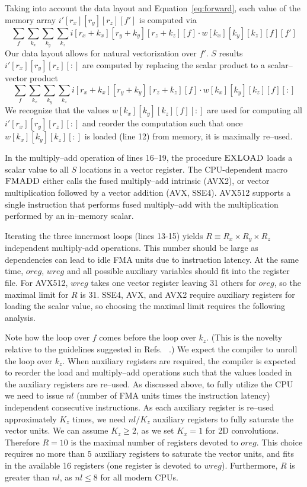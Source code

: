   Taking into account the data layout and Equation~\ref{eq:forward},
  each value of the memory array $i'[r_x][r_y][r_z][f']$ is computed
  via
  {\footnotesize
  \[
    \sum_{f} \sum_{k_x} \sum_{k_y} \sum_{k_z}
    i[r_x+k_x][r_y+k_y][r_z+k_z][f] \cdot w[k_x][k_y][k_z][f][f']
    \]
    }
  Our data layout allows for natural vectorization over $f'$.  $S$
  results $i'[r_x][r_y][r_z][:]$ are computed by replacing the scalar
  product to a scalar--vector product
{\footnotesize
  \[
  \sum_{f} \sum_{k_x} \sum_{k_y} \sum_{k_z}
  i[r_x+k_x][r_y+k_y][r_z+k_z][f] \cdot w[k_x][k_y][k_z][f][:]
  \]
}
  We recognize that the values $w[k_x][k_y][k_z][f][:]$ are used for
  computing all $i'[r_x][r_y][r_z][:]$ and reorder the computation
  such that once $w[k_x][k_y][k_z][:]$ is loaded (line 12) from
  memory, it is maximally re--used.

  In the multiply--add operation of lines 16--19, the procedure
  $\textnormal{\scshape EXLOAD}$ loads a scalar value to all $S$ locations in a
  vector register.  The CPU-dependent macro $\textnormal{\scshape FMADD}$ either
  calls the fused multiply--add intrinsic (AVX2), or vector
  multiplication followed by a vector addition (AVX, SSE4).  AVX512
  supports a single instruction that performs fused multiply--add with
  the multiplication performed by an in--memory scalar.

  Iterating the three innermost loops (lines 13-15) yields $R\equiv R_x \times
  R_y \times R_z$ independent multiply-add operations.  This number
  should be large as dependencies can lead to idle FMA units due to
  instruction latency. At the same time, $oreg$, $wreg$ and all
  possible auxiliary variables should fit into the register file.  For
  AVX512, $wreg$ takes one vector register leaving 31 others for
  $oreg$, so the maximal limit for $R$ is 31.
  SSE4, AVX, and AVX2 require auxiliary registers for loading the
  scalar value, so choosing the maximal limit requires the following
  analysis.

  Note how the loop over $f$ comes before the loop over $k_z$.  (This
  is the novelty relative to the guidelines suggested in
  Refs. ~\cite{chellapilla2006high,das2016distributed}.) We expect the
  compiler to unroll the loop over $k_z$.  When auxiliary registers
  are required, the compiler is expected to reorder the load and
  multiply--add operations such that the values loaded in the
  auxiliary registers are re--used.  As discussed above, to fully
  utilize the CPU we need to issue $nl$ (number of FMA units times the
  instruction latency) independent consecutive instructions.  As each
  auxiliary register is re--used approximately $K_z$ times, we need
  $nl/K_z$ auxiliary registers to fully saturate the vector units.  We
  can assume $K_z \ge 2$, as we set $K_x=1$ for 2D convolutions.
  Therefore $R = 10$ is the maximal number of registers devoted to
  $oreg$. This choice requires no more than $5$ auxiliary registers to
  saturate the vector units, and fits in the available 16 registers
  (one register is devoted to $wreg$). Furthermore, $R$ is greater
  than $nl$, as $nl \le 8$ for all modern CPUs.


